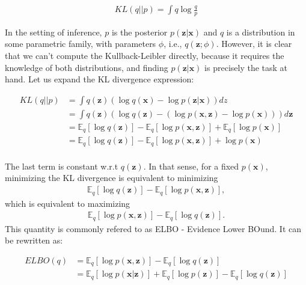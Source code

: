 \begin{align}
    KL(q||p) = \int q \log\frac{q}{p}
\end{align}

In the setting of inference, $p$ is the posterior $p(\bm{z}|\bm{x})$ and $q$ is a distribution
in some parametric family, with parameters $\phi$, i.e., $q(\bm{z}; \phi)$. However,
it is clear that we can't compute the Kullback-Leibler directly, because it
requires the knowledge of both distributions, and finding $p(\bm{z}|\bm{x})$ is
precisely the task at hand. Let us expand the KL divergence expression:

\begin{align}
    KL(q||p) &= \int q(\bm{z}) (\log q(\bm{x}) - \log p(\bm{z}|\bm{x})) dz \\
             &= \int q(\bm{z}) (\log q(\bm{z}) - (\log p(\bm{x}, \bm{z}) - \log p(\bm{x}))) d\bm{z} \\
             &= \mathbb{E}_q [\log q(\bm{z})] - \mathbb{E}_q [\log p(\bm{x}, \bm{z})] + \mathbb{E}_q [\log p(\bm{x})] \\
             &= \mathbb{E}_q [\log q(\bm{z})] - \mathbb{E}_q [\log p(\bm{x}, \bm{z})] + \log p(\bm{x}) \\
\end{align}

The last term is constant w.r.t $q(\bm{z})$. In that sense, for a fixed $p(\bm{x})$,
minimizing the KL divergence is equivalent to minimizing
\begin{align}
    \mathbb{E}_q [\log q(\bm{z})] - \mathbb{E}_q [\log p(\bm{x}, \bm{z})],
\end{align} which is equivalent to maximizing
\begin{align}
    \mathbb{E}_q [\log p(\bm{x}, \bm{z})] - \mathbb{E}_q [\log q(\bm{z})]. \label{eq:elbokldiv}
\end{align} This quantity is commonly refered to as ELBO - Evidence Lower BOund.
It can be rewritten as:

\begin{align}
    ELBO(q) &= \mathbb{E}_q [\log p(\bm{x}, \bm{z})] - \mathbb{E}_q [\log q(\bm{z})] \\
            &= \mathbb{E}_q [\log p(\bm{x}|\bm{z})] + \mathbb{E}_q [\log p(\bm{z})] - \mathbb{E}_q [\log q(\bm{z})]
\end{align}

